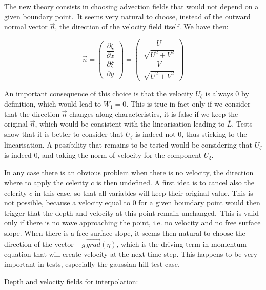 The new theory consists in choosing advection fields that would not depend
on a given boundary point.\ It seems very natural to choose, instead of the
outward normal vector $\vec{n}$, the direction of the velocity
field itself. We have then:

\begin{equation}
\vec{n}=\left( 
\begin{array}{c}
\dfrac{\partial \xi }{\partial x} \\ 
\dfrac{\partial \xi }{\partial y}%
\end{array}
\right) =\left( 
\begin{array}{c}
\dfrac{U}{\sqrt{U^{2}+V^{2}}} \\ 
\dfrac{V}{\sqrt{U^{2}+V^{2}}}%
\end{array}
\right)  \label{newtheory}
\end{equation}

An important consequence of this choice is that the velocity $\overline{U}%
_{\zeta }$ is always 0 by definition, which would lead to $W_{1}=0$. This is
true in fact only if we consider that the direction $\vec{n}$
changes along characteristics, it is false if we keep the original $%
\vec{n}$, which would be consistent with the linearisation
leading to $\overline{L}$. Tests show that it is better to consider that $%
U_{\zeta }$ is indeed not 0, thus sticking to the linearisation. A
possibility that remains to be tested would be considering that $U_{\zeta }$
is indeed 0, and taking the norm of velocity for the component $U_{\xi }$.

In any case there is an obvious problem when there is no velocity, the
direction where to apply the celerity $c$ is then undefined. A first idea is
to cancel also the celerity $c$ in this case, so that all variables will
keep their original value. This is not possible, because a velocity equal to
0 for a given boundary point would then trigger that the depth and velocity
at this point remain unchanged.\ This is valid only if there is no wave
approaching the point, i.e. no velocity and no free surface slope. When
there is a free surface slope, it seems then natural to choose the direction
of the vector $-g\,\vec{grad}(\eta)$, which is the driving term
in momentum equation that will create velocity at the next time step. This
happens to be very important in tests, especially the gaussian hill test
case.

Depth and velocity fields for interpolation:\\

